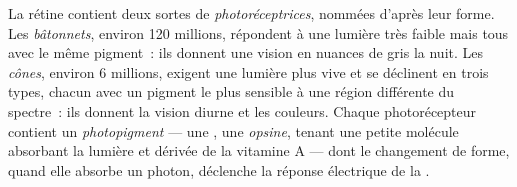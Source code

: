 \begin{definition}[Photorécepteurs]\label{def:g11:the-eye:photoreceptors}
La rétine contient deux sortes de 
\emph{photoréceptrices}, nommées d'après leur
forme. Les \emph{bâtonnets}, environ 120
millions, répondent à une lumière très faible mais tous avec le même
pigment~: ils donnent une vision en nuances de gris la nuit. Les
\emph{cônes}, environ 6 millions, exigent une
lumière plus vive et se déclinent en trois types, chacun avec un
pigment le plus sensible à une région différente du spectre~: ils
donnent la vision diurne et les couleurs. Chaque photorécepteur
contient un \emph{photopigment} --- une , une
\emph{opsine}, tenant une petite molécule absorbant la
lumière et dérivée de la vitamine A --- dont le changement de forme,
quand elle absorbe un photon, déclenche la réponse électrique de la
.
\end{definition}


